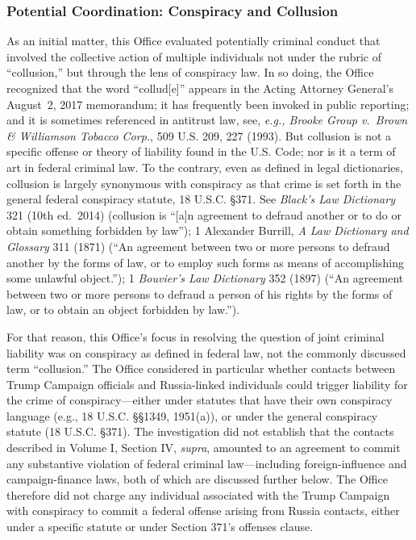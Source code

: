 \subsubsection{Potential Coordination: Conspiracy and Collusion}
As an initial matter, this Office evaluated potentially criminal conduct that involved the collective action of multiple individuals not under the rubric of ``collusion,'' but through the lens of conspiracy law.
In so doing, the Office recognized that the word ``collud[e]'' appears in the Acting Attorney General's August~2, 2017 memorandum; it has frequently been invoked in public reporting; and it is sometimes referenced in antitrust law, see, \textit{e.g., Brooke Group v.\ Brown \& Williamson Tobacco Corp.}, 509 U.S. 209, 227 (1993).
But collusion is not a specific offense or theory of liability found in the U.S. Code; nor is it a term of art in federal criminal law.
To the contrary, even as defined in legal dictionaries, collusion is largely synonymous with conspiracy as that crime is set forth in the general federal conspiracy statute, 18 U.S.C. \S 371.
See \textit{Black's Law Dictionary} 321 (10th ed.~2014) (collusion is ``[a]n agreement to defraud another or to do or obtain something forbidden by law''); 1 Alexander Burrill, \textit{A Law Dictionary and Glossary} 311 (1871) (``An agreement between two or more persons to defraud another by the forms of law, or to employ such forms as means of accomplishing some unlawful object.''); 1 \textit{Bouvier's Law Dictionary} 352 (1897) (``An agreement between two or more persons to defraud a person of his rights by the forms of law, or to obtain an object forbidden by law.'').

For that reason, this Office's focus in resolving the question of joint criminal liability was on conspiracy as defined in federal law, not the commonly discussed term ``collusion.''
The Office considered in particular whether contacts between Trump Campaign officials and Russia-linked individuals could trigger liability for the crime of conspiracy---either under statutes that have their own conspiracy language (e.g., 18 U.S.C. \S\S 1349, 1951(a)), or under the general conspiracy statute (18 U.S.C. \S 371).
The investigation did not establish that the contacts described in Volume I, Section IV, \textit{supra}, amounted to an agreement to commit any substantive violation of federal criminal law---including foreign-influence and campaign-finance laws, both of which are discussed further below.
The Office therefore did not charge any individual associated with the Trump Campaign with conspiracy to commit a federal offense arising from Russia contacts, either under a specific statute or under Section 371's offenses clause.

